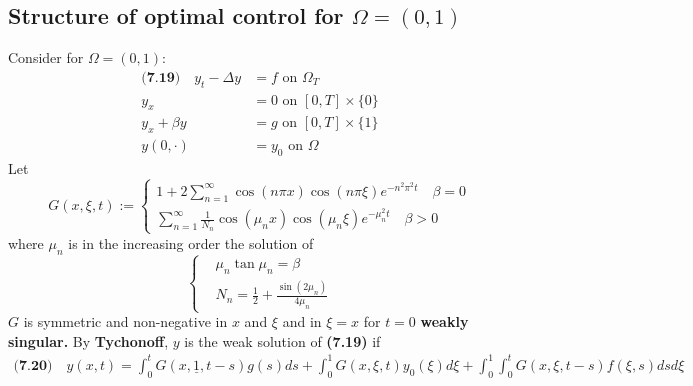 \documentclass[a4paper,11pt,fleqn]{book}
\theoremstyle{definition}
\theoremstyle{remark}
\begin{document}
\subsection{Structure of optimal control for $\Omega = (0, 1)$}
Consider for $\Omega = (0, 1)$:
\begin{align*}
	\textbf{(7.19)} \quad
	y_t - \Delta y &= f \text{ on } \Omega_T\\
	y_x &= 0 \text{ on } [0, T] \times \{0 \}\\
	y_x + \beta y &= g \text{ on } [0, T] \times \{1\}\\
	y(0, \cdot) &= y_0 \text{ on } \Omega
\end{align*}
Let
\begin{equation*}
	G(x, \xi, t):= 
	\left\{
	\begin{aligned}
		1 + 2 \sum_{n = 1}^\infty \cos(n\pi x)\cos(n \pi \xi)e^{-n^2 \pi^2 t}
		\quad \beta = 0\\
		\sum_{n = 1}^\infty \frac{1}{N_n}\cos(\mu_n x ) \cos(\mu_n \xi)e^{-\mu_n^2 t} \quad \beta > 0
	\end{aligned}
	\right.
\end{equation*}
where $\mu_n$ is in the increasing order the solution of 
\begin{equation*}
\left\{	
\begin{aligned}
	&\mu_n \tan \mu_n = \beta \\
	&N_n = \frac{1}{2} + \frac{\sin(2 \mu_n)}{4 \mu_n}
\end{aligned}
\right.
\end{equation*}
$G$ is symmetric and non-negative in $x$ and $\xi$ and in $\xi = x$ for $t = 0$ \textbf{weakly singular.} By \textbf{Tychonoff}, $y$ is the weak solution of \textbf{(7.19)} if 
\begin{align*}
\textbf{(7.20)} \quad
	y(x, t) = \int_0^t G(x, \underline{1}, t - s)g(s)ds + \int_0^1 G(x, \xi, t)y_0(\xi)d\xi + \int_0^1 \int_0^tG(x, \xi, t - s) f(\xi, s) ds d\xi
\end{align*}
\end{document}
